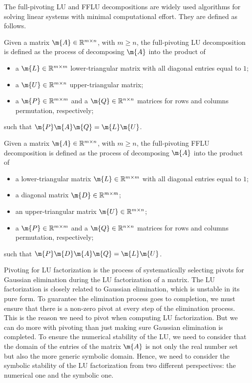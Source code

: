 The full-pivoting \ac{LU} and \ac{FFLU} decompositions are widely used algorithms for solving linear systems with minimal computational effort. They are defined as follows.
%
\begin{definition}
  Given a matrix $\m{A} \in \mathbb{R}^{m \times n}$, with $m \geq n$, the full-pivoting \ac{LU} decomposition is defined as the process of decomposing $\m{A}$ into the product of
  \begin{itemize}
    \setlength{\itemsep}{0.0em}
    \item a $\m{L} \in \mathbb{R}^{m \times m}$ lower-triangular matrix with all diagonal entries equal to $1$;
    \item a $\m{U} \in \mathbb{R}^{m \times n}$ upper-triangular matrix;
    \item a $\m{P} \in \mathbb{R}^{m \times m}$ and a $\m{Q} \in \mathbb{R}^{n \times n}$ matrices for rows and columns permutation, respectively;
  \end{itemize}
  such that $\m{P}\m{A}\m{Q} = \m{L}\m{U}$.
\end{definition}
%
\begin{definition}
  Given a matrix $\m{A} \in \mathbb{R}^{m \times n}$, with $m \geq n$, the full-pivoting \ac{FFLU} decomposition is defined as the process of decomposing $\m{A}$ into the product of
  \begin{itemize}
    \setlength{\itemsep}{0.0em}
    \item a lower-triangular matrix $\m{L} \in \mathbb{R}^{m \times m}$ with all diagonal entries equal to $1$;
    \item a diagonal matrix $\m{D} \in \mathbb{R}^{m \times m}$;
    \item an upper-triangular matrix $\m{U} \in \mathbb{R}^{m \times n}$;
    \item a $\m{P} \in \mathbb{R}^{m \times m}$ and a $\m{Q} \in \mathbb{R}^{n \times n}$ matrices for rows and columns permutation, respectively;
  \end{itemize}
  such that $\m{P}\m{D}\m{A}\m{Q} = \m{L}\m{U}$.
\end{definition}
%
Pivoting for \ac{LU} factorization is the process of systematically selecting pivots for Gaussian elimination during the \ac{LU} factorization of a matrix. The \ac{LU} factorization is closely related to Gaussian elimination, which is unstable in its pure form. To guarantee the elimination process goes to completion, we must ensure that there is a non-zero pivot at every step of the elimination process. This is the reason we need to pivot when computing \ac{LU} factorization. But we can do more with pivoting than just making sure Gaussian elimination is completed. To ensure the numerical stability of the \ac{LU}, we need to consider that the domain of the entries of the matrix $\m{A}$ is not only the real number set but also the more generic symbolic domain. Hence, we need to consider the symbolic stability of the \ac{LU} factorization from two different perspectives: the numerical one and the symbolic one.

